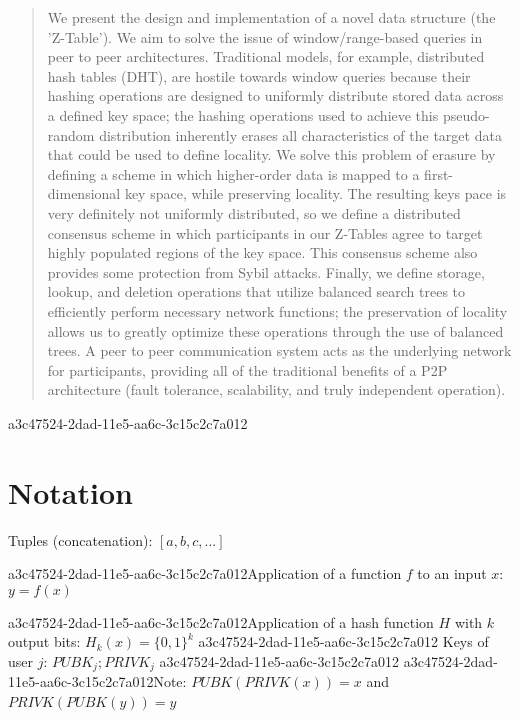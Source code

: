 \documentclass[12pt]{article}
\begin{document}
\maketitle

\begin{abstract}
We present the design and implementation of a novel data structure (the 'Z-Table'). We aim to solve the issue of window/range-based queries in peer to peer architectures. Traditional models, for example,  distributed hash tables (DHT), are hostile towards window queries because their hashing operations are designed to uniformly distribute stored data across a defined key space; the hashing operations used to achieve this pseudo-random distribution inherently erases all characteristics of the target data that could be used to define locality. We solve this problem of erasure by defining a scheme in which higher-order data is mapped to a first-dimensional key space, while preserving locality. The resulting keys pace is very definitely not uniformly distributed, so we define a distributed consensus scheme in which participants in our Z-Tables agree to target highly populated regions of the key space. This consensus scheme also provides some protection from Sybil attacks. Finally, we define storage, lookup, and deletion operations that utilize balanced search trees to efficiently perform necessary network functions; the preservation of locality allows us to greatly optimize these operations through the use of balanced trees. A peer to peer communication system acts as the underlying network for participants, providing all of the traditional benefits of a P2P architecture (fault tolerance, scalability, and truly independent operation).
\end{abstract}

a3c47524-2dad-11e5-aa6c-3c15c2c7a012\section{Notation}

Tuples (concatenation): $[a,b,c,...]$

a3c47524-2dad-11e5-aa6c-3c15c2c7a012Application of a function $f$ to an input $x$: $y=f(x)$

a3c47524-2dad-11e5-aa6c-3c15c2c7a012Application of a hash function $H$ with $k$ output bits: $H_{k}(x) = \{0,1\}^k$
a3c47524-2dad-11e5-aa6c-3c15c2c7a012
Keys of user $j$: $ PUBK_j; PRIVK_j $
a3c47524-2dad-11e5-aa6c-3c15c2c7a012
a3c47524-2dad-11e5-aa6c-3c15c2c7a012Note: $PUBK(PRIVK(x)) = x$ and $PRIVK(PUBK(y)) = y$~
\end{document}
